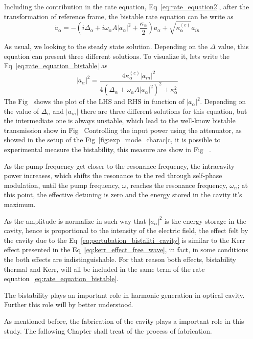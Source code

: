 Including the contribution in the rate equation, Eq~\ref{eq:rate_equation2}, after the transformation of reference frame, the bistable rate equation can be write as 
\begin{equation}
\dot{a}_\alpha = -\left(i\Delta_\alpha + i\omega_\alpha A|a_\alpha|^2 + \frac{\kappa_\alpha}{2}\right)a_\alpha + \sqrt{\kappa^{(e)}_\alpha}a_{in}
\label{eq:rate_equation_bistable}
\end{equation}

As usual, we looking to the steady state solution. Depending on the $\Delta$ value, this equation can present three different solutions. To visualize it, lets write the Eq~\ref{eq:rate_equation_bistable} as 
\begin{equation}
    |a_\alpha|^2 = \frac{4\kappa^{(e)}_\alpha |a_{in}|^2}{4\left(\Delta_\alpha + \omega_\alpha A|a_\alpha|^2\right)^2+\kappa_\alpha^2} 
\end{equation}
The Fig~%
shows the plot of the LHS and RHS in function of $|a_\alpha|^2$. Depending on the value of $\Delta_\alpha$ and $|a_{in}|$ there are three different solutions for this equation, but the intermediate one is always unstable, which lead to the well-know bistable transmission show in Fig~%
Controlling the input power using the attenuator, as showed in the setup of the Fig~\ref{fig:exp_mode_charac}c, it is possible to experimental measure the bistability, this measure are show in Fig~%
.

As the pump frequency get closer to the resonance frequency, the intracavity power increases, which shifts the resonance to the red through self-phase modulation, until the pump frequency, $\omega$, reaches the resonance frequency, $\omega_\alpha$; at this point, the effective detuning is zero and the energy stored in the cavity it's maximum.  

As the amplitude is normalize in such way that $|a_\alpha|^2$ is the energy storage in the cavity, hence is proportional to the intensity of the electric field, the effect felt by the cavity due to the Eq~\ref{eq:pertubation_bistaliti_cavity} is similar to the Kerr effect presented in the Eq~\ref{eq:kerr_effect_free_wave}, in fact, in some conditions the both effects are indistinguishable\needcit. For that reason both effects, bistability thermal and Kerr, will all be included in the same term of the rate equation~\ref{eq:rate_equation_bistable}.

The bistability plays an important role in harmonic generation in optical cavity. Further this role will by better understood.  

As mentioned before, the fabrication of the cavity plays a important role in this study. The fallowing Chapter shall treat of the process of fabrication. 
